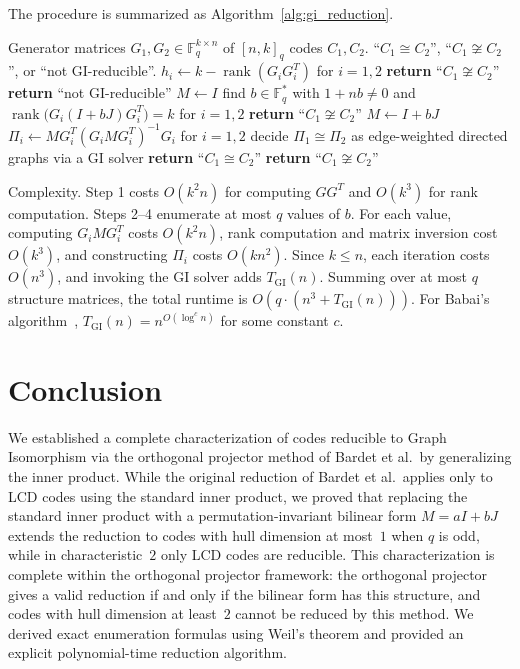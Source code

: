 \documentclass[11pt]{article}
\newcommand{\FF}{\mathbb{F}}
\newcommand{\0}{\mathbf{0}}
\newcommand{\1}{\mathbf{1}}
\DeclareMathOperator{\rank}{rank}
\theoremstyle{plain}
\theoremstyle{definition}
\theoremstyle{remark}
\begin{document}
The procedure is summarized as Algorithm~\ref{alg:gi_reduction}.

\begin{algorithm}[h]
\caption{Reduction from PEP to GI via permutation-invariant bilinear forms}
\label{alg:gi_reduction}
\begin{algorithmic}[1]
\REQUIRE Generator matrices $G_1, G_2 \in \FF_q^{k \times n}$ of $[n,k]_q$ codes $C_1, C_2$.
\ENSURE ``$C_1 \cong C_2$'', ``$C_1 \not\cong C_2$'', or ``not GI-reducible''.
\STATE $h_i \gets k - \rank(G_i G_i^T)$ for $i = 1, 2$ \hfill{}
  \STATE \textbf{return} ``$C_1 \not\cong C_2$''
\ENDIF
{}
  \STATE \textbf{return} ``not GI-reducible''
\ENDIF
{}
  \STATE $M \gets I$ \hfill{}
\ELSE
  \STATE find $b \in \FF_q^*$ with $1 + nb \neq 0$ and $\rank\bigl(G_i (I + bJ) G_i^T\bigr) = k$ for $i = 1, 2$
    \STATE \textbf{return} ``$C_1 \not\cong C_2$'' \hfill{}
  \ENDIF
  \STATE $M \gets I + bJ$
\ENDIF
\STATE $\Pi_i \gets M G_i^T (G_i M G_i^T)^{-1} G_i$ for $i = 1, 2$
\STATE decide $\Pi_1 \cong \Pi_2$ as edge-weighted directed graphs via a GI solver
  \STATE \textbf{return} ``$C_1 \cong C_2$''
\ELSE
  \STATE \textbf{return} ``$C_1 \not\cong C_2$''
\ENDIF
\end{algorithmic}
\end{algorithm}

Complexity. Step 1 costs $O(k^2 n)$ for computing $GG^T$ and $O(k^3)$ for rank computation. Steps 2--4 enumerate at most $q$ values of $b$. For each value, computing $G_i M G_i^T$ costs $O(k^2 n)$, rank computation and matrix inversion cost $O(k^3)$, and constructing $\Pi_i$ costs $O(kn^2)$. Since $k \leq n$, each iteration costs $O(n^3)$, and invoking the GI solver adds $T_{\mathrm{GI}}(n)$. Summing over at most $q$ structure matrices, the total runtime is $O(q \cdot (n^3 + T_{\mathrm{GI}}(n)))$. For Babai's algorithm~\cite{babai2016}, $T_{\mathrm{GI}}(n) = n^{O(\log^c n)}$ for some constant $c$.

\section{Conclusion}
\label{sec:conclusion}

We established a complete characterization of codes reducible to Graph Isomorphism via the orthogonal projector method of Bardet et al.\ by generalizing the inner product. While the original reduction of Bardet et al.\ applies only to LCD codes using the standard inner product, we proved that replacing the standard inner product with a permutation-invariant bilinear form $M = aI + bJ$ extends the reduction to codes with hull dimension at most~$1$ when $q$ is odd, while in characteristic~$2$ only LCD codes are reducible. This characterization is complete within the orthogonal projector framework: the orthogonal projector gives a valid reduction if and only if the bilinear form has this structure, and codes with hull dimension at least~$2$ cannot be reduced by this method. We derived exact enumeration formulas using Weil's theorem and provided an explicit polynomial-time reduction algorithm.
\end{document}
